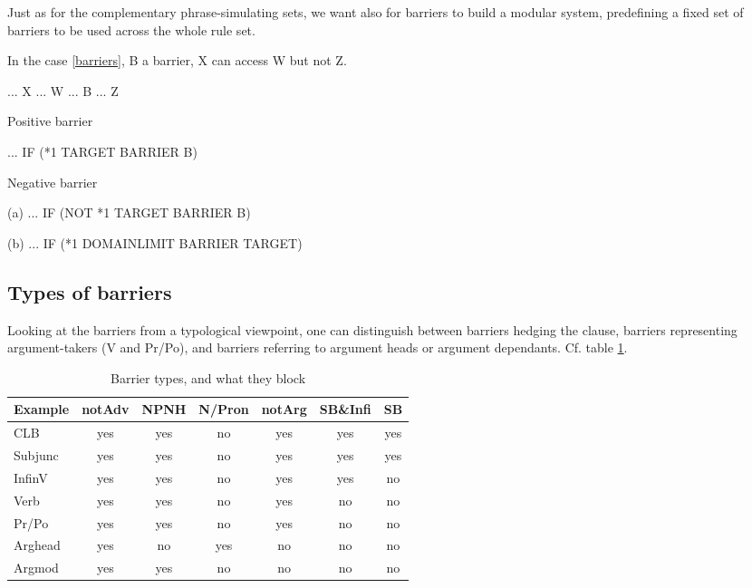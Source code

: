 \documentclass[a4paper,english]{article} %
\begin{document}
Just as for the complementary phrase-simulating sets, we want also for barriers to build a modular system, predefining a fixed set of barriers to be used across the whole rule set.%

In the case \ref{barriers}, B a barrier, X can access W but not Z.%

\begin{example}\label{barriers}
... X ... W ... B ... Z 
\end{example}


\begin{example}\label{posi-barriers}
Positive barrier
\item[] ... IF (*1 TARGET BARRIER B)
\end{example}

\begin{example}\label{nega-barriers}
Negative barrier
\item[(a)] ... IF (NOT *1 TARGET BARRIER B)
\item[(b)] ... IF (*1 DOMAINLIMIT BARRIER TARGET)
\end{example}


\subsection{Types of barriers}

Looking at the barriers from a typological viewpoint, one can distinguish between barriers hedging the clause, barriers representing argument-takers (V and Pr/Po), and barriers referring to argument heads or argument dependants. Cf. table \ref{btypol}.%

\begin{table}[htdp]
\caption{Barrier types, and what they block}
\begin{center}
\begin{tabular}{|l|c|c|c|c|c|c|}
\hline
Example &  notAdv  & NPNH & N/Pron & notArg & SB\&Infi & SB  \\ \hline
CLB     &  yes     & yes  & no     & yes    & yes     & yes \\
Subjunc &  yes     & yes  & no     & yes    & yes     & yes \\ 
\hline
InfinV  &  yes     & yes  & no     & yes    & yes     & no  \\
Verb    &  yes     & yes  & no     & yes    & no      & no  \\
Pr/Po   &  yes     & yes  & no     & yes    & no      & no  \\
\hline
Arghead &  yes     & no   & yes    & no     & no      & no  \\
Argmod  &  yes     & yes  & no     & no     & no      & no  \\ 
\hline
\end{tabular}
\end{center}
\label{btypol}
\end{table}%
\end{document}
